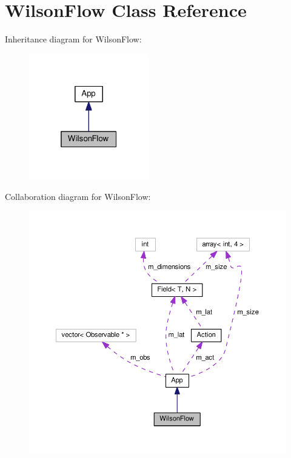 \hypertarget{classWilsonFlow}{}\section{Wilson\+Flow Class Reference}
\label{classWilsonFlow}


Inheritance diagram for Wilson\+Flow\+:
\nopagebreak
\begin{figure}[H]
\begin{center}
\leavevmode
\includegraphics[width=148pt]{classWilsonFlow__inherit__graph}
\end{center}
\end{figure}


Collaboration diagram for Wilson\+Flow\+:
\nopagebreak
\begin{figure}[H]
\begin{center}
\leavevmode
\includegraphics[width=350pt]{classWilsonFlow__coll__graph}
\end{center}
\end{figure}
